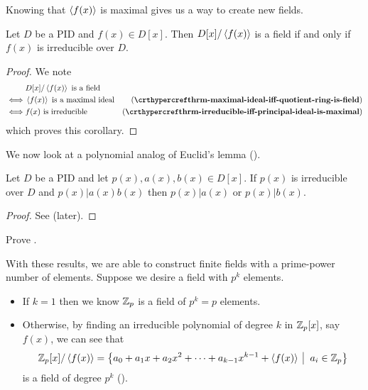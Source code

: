 Knowing that $\left\langle f(x)\right\rangle$ is maximal gives us a way to create new fields.

\begin{corollary}\label{corollary-polynomial-quotient-by-principal-ideal-is-field-iff-polynomial-irreducible}
    Let $D$ be a PID and $f(x) \in D[x]$. Then $D[x]/\left\langle f(x)\right\rangle$ is a field if and only if $f(x)$ is irreducible over $D$.
\end{corollary}
\begin{proof}
    We note
    \begin{align*}
        &D[x]/\princ{f(x)} \text{ is a field}\\
        \iff&\princ{f(x)} \text{ is a maximal ideal} & (\myref{thrm-maximal-ideal-iff-quotient-ring-is-field})\\
        \iff&f(x) \text{ is irreducible} & (\myref{thrm-irreducible-iff-principal-ideal-is-maximal})
    \end{align*}
    which proves this corollary.
\end{proof}

We now look at a polynomial analog of Euclid's lemma ().

\begin{corollary}\label{corollary-irreducible-polynomial-division-rule}
    Let $D$ be a PID and let $p(x), a(x), b(x) \in D[x]$. If $p(x)$ is irreducible over $D$ and $p(x) \vert a(x)b(x)$ then $p(x) \vert a(x)$ or $p(x) \vert b(x)$.
\end{corollary}
\begin{proof}
    See  (later).
\end{proof}

\begin{exercise}\label{exercise-irreducible-polynomial-division-rule}
    Prove .
\end{exercise}

With these results, we are able to construct finite fields with a prime-power number of elements. Suppose we desire a field with $p^k$ elements.
\begin{itemize}
    \item If $k = 1$ then we know $\mathbb{Z}_p$ is a field of $p^k = p$ elements.
    \item Otherwise, by finding an irreducible polynomial of degree $k$ in $\mathbb{Z}_p[x]$, say $f(x)$, we can see that
    \[
        \Z_p[x]/\princ{f(x)} = \left\{a_0 + a_1x + a_2x^2 + \cdots + a_{k-1}x^{k-1} + \princ{f(x)} \vert a_i \in \Z_p\right\}
    \]
    is a field of degree $p^k$ ().
\end{itemize}

